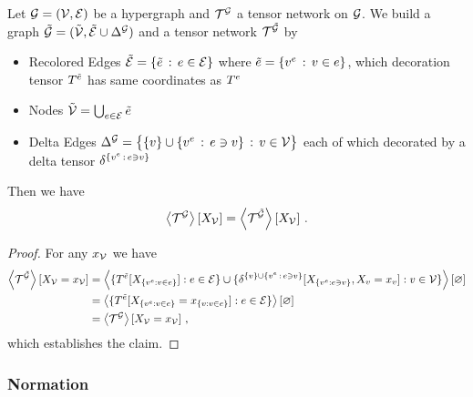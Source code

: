 \begin{lemma}\label{lem:deltification}
	Let $\mathcal{G}=(\mathcal{V},\mathcal{E})$ be a hypergraph and $\mathcal{T}^{\mathcal{G}}$ a tensor network on $\mathcal{G}$.
	We build a graph $\tilde{\mathcal{G}}=(\tilde{\mathcal{V}},\tilde{\mathcal{E}}\cup\Delta^{\mathcal{G}})$ and a tensor network $\mathcal{T}^{\tilde{\mathcal{G}}}$ by %
	\begin{itemize}
		\item Recolored Edges $\tilde{\mathcal{E}} = \{\tilde{e} \, : \, e\in \mathcal{E}\}$ where $\tilde{e} = \{v^{e} \, : \, v\in e\}$, which decoration tensor $T^{\tilde{e}}$ has same coordinates as $T^{e}$
		\item Nodes $\tilde{\mathcal{V}} = \bigcup_{e\in\mathcal{E}}\tilde{e}$ %
		\item Delta Edges $\Delta^{\mathcal{G}} =  \big\{ \{v\} \cup \{v^{e} \, : \, e\ni v \} \, : \, v\in\mathcal{V} \big\} $ each of which decorated by a delta tensor $\delta^{\{v^{e} \, : \, e\ni v \}}$
	\end{itemize}
	 Then we have
	 	\[ \left\langle \mathcal{T}^{\mathcal{G}}\right\rangle \left[ X_{\mathcal{V}} \right] =  \left\langle \mathcal{T}^{\tilde{\mathcal{G}}}\right\rangle \left[ X_{\mathcal{V}} \right]  \, . \]
\end{lemma}
\begin{proof}
	For any $x_{\mathcal{V}}$ we have 
	\begin{align*}
		 \left\langle \mathcal{T}^{\tilde{\mathcal{G}}}\right\rangle \left[ X_{\mathcal{V}}=x_{\mathcal{V}} \right] 
		 & = \left\langle \{T^{\tilde{e}}[X_{\{v^{e} : v\in e\}}] : e \in \mathcal{E} \}\cup 
		 	\{\delta^{\{v\} \cup \{v^{e} \, : \, e\ni v \}}[X_{\{v^{e} : e\ni v \}}, X_{v}=x_{v} ]  : v\in\mathcal{V} \}
		 \right\rangle \left[ \varnothing \right] \\
		 & =  \left\langle \{T^{\tilde{e}}[X_{\{v^{e} : v\in e\}} = x_{\{v : v\in e\}} ] : e \in \mathcal{E} \}
		 \right\rangle \left[ \varnothing \right] \\
		 & = \left\langle \mathcal{T}^{\mathcal{G}}\right\rangle \left[ X_{\mathcal{V}}=x_{\mathcal{V}} \right] \, ,
	\end{align*}
	which establishes the claim.
\end{proof}



\subsubsection{Normation}


